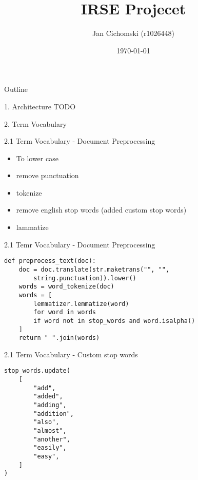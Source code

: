 \documentclass{beamer}
\title{IRSE Projecet}
\author{Jan Cichomski (r1026448)}
\date{\today}
\begin{document}
\begin{frame}
  \titlepage
\end{frame}

\begin{frame}{Outline}
  \tableofcontents
\end{frame}
\begin{frame}{1. Architecture}
  TODO
\end{frame}

\begin{frame}{2. Term Vocabulary}

\end{frame}

\begin{frame}{2.1 Term Vocabulary - Document Preprocessing}
  \begin{itemize}
    \item To lower case
    \item remove punctuation
    \item tokenize
    \item remove english stop words (added custom stop words)
    \item lammatize
  \end{itemize}
\end{frame}

\begin{frame}[fragile]{2.1 Temr Vocabulary - Document Preprocessing}
    \begin{verbatim}
def preprocess_text(doc):
    doc = doc.translate(str.maketrans("", "",
        string.punctuation)).lower()
    words = word_tokenize(doc)
    words = [
        lemmatizer.lemmatize(word)
        for word in words
        if word not in stop_words and word.isalpha()
    ]
    return " ".join(words)
    \end{verbatim}
\end{frame}
\begin{frame}[fragile]{2.1 Term Vocabulary - Custom stop words}
    \begin{verbatim}
stop_words.update(
    [
        "add",
        "added",
        "adding",
        "addition",
        "also",
        "almost",
        "another",
        "easily",
        "easy",
    ]
)
    \end{verbatim}
\end{frame}
\end{document}

